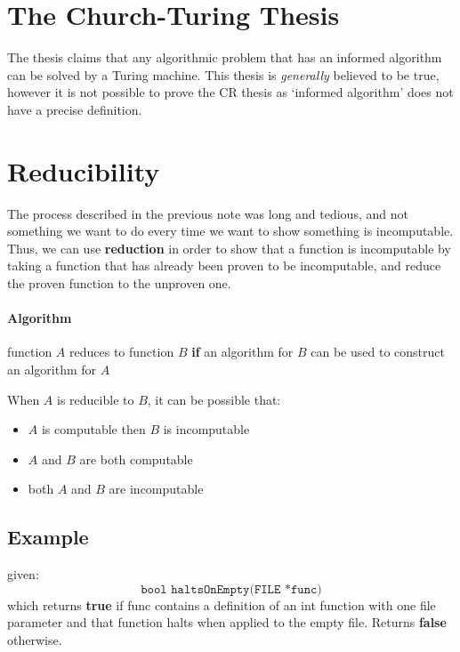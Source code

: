 \documentclass[12pt]{book}
\title{\coursetitle\linebreak\lecturename}
\author{\\Cain Susko\\ 
           \\ \\ \\
      Queen's University 
    \\School of Computing\\}
\begin{document}
\begin{titlepage}
        \maketitle
\end{titlepage}


\section*{The Church-Turing Thesis}
The thesis claims that any algorithmic problem that has an informed algorithm can be solved
by a Turing machine. This thesis is \textit{generally} believed to be true, however it is not
possible to prove the CR thesis as `informed algorithm' does not have a precise definition.

\section*{Reducibility}
The process described in the previous note was long and tedious, and not something we want to
do every time we want to show something is incomputable. Thus, we can use \textbf{reduction}
in order to show that a function is incomputable by taking a function that has already been 
proven to be incomputable, and reduce the proven function to the unproven one.

\paragraph{Algorithm}
function $A$ reduces to function $B$ \textbf{if} an algorithm for $B$ can be used to construct
an algorithm for $A$

When $A$ is reducible to $B$, it can be possible that:
\begin{itemize}
        \item $A$ is computable then $B$ is incomputable
        \item $A$ and $B$ are both computable
        \item both $A$ and $B$ are incomputable 
\end{itemize}

\subsection*{Example}
given:
\[\texttt{bool haltsOnEmpty(FILE *func)}\]
which returns \textbf{true} if func contains a definition of an
int function with one file parameter and that function halts when 
applied to the empty file. Returns \textbf{false} otherwise.
\end{document}
